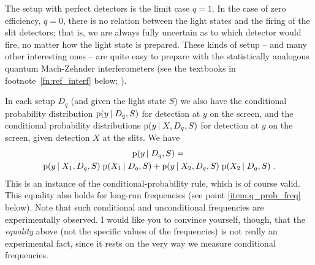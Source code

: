 \documentclass[\ifafour a4paper,12pt,\else a5paper,10pt,\fi%
onecolumn,oneside,article,%
british%
]{memoir}
\theoremstyle{remark}
\theoremstyle{innote}
\newcommand*{\pf}{\mathrm{p}}%
\renewcommand*{\|}[1][]{\nonscript\,#1\vert\nonscript\;\mathopen{}}
\newcommand*{\sect}{\S}%
\newcommand*{\yxa}{X_{1}}
\newcommand*{\yxb}{X_{2}}
\newcommand*{\yDq}{D_{q}}
\begin{document}
The setup with perfect detectors is the limit case $q=1$. In the case of
zero efficiency, $q=0$, there is no relation between the light states and
the firing of the slit detectors; that is, we are always fully uncertain as
to which detector would fire, no matter how the light state is prepared.
These kinds of setup -- and many other interesting ones -- are quite easy
to prepare with the statistically analogous quantum Mach-Zehnder
interferometers (see the textbooks in footnote~\ref{fn:ref_interf} below;
\cites[\sect~4.2]{leonhardt1997}{yuenetal1978}).
  
In each setup $\yDq$ (and given the light state $S$) we also have the
conditional probability distribution $\pf(y \| \yDq,S)$ for detection at
$y$ on the screen, and the conditional probability distributions
$\pf(y \| X,\yDq,S)$ for detection at $y$ on the screen, given detection
$X$ at the slits. We have
\begin{multline}
  \label{eq:conditional_q}
  \pf(y \| \yDq, S) ={}\\
  \pf(y \| \yxa, \yDq, S) \;\pf( \yxa \| \yDq, S) +
  \pf(y \| \yxb, \yDq, S) \;\pf( \yxb \| \yDq, S) \;.
\end{multline}
This is an instance of the conditional-probability rule, which is of course
valid. This equality also holds for long-run frequencies (see point
\ref{item:q_prob_freq} below). Note that such conditional and unconditional
frequencies are experimentally observed. I would like you to convince
yourself, though, that the \emph{equality} above (not the specific values
of the frequencies) is not really an experimental fact, since it rests on
the very way we measure conditional frequencies.
\end{document}
